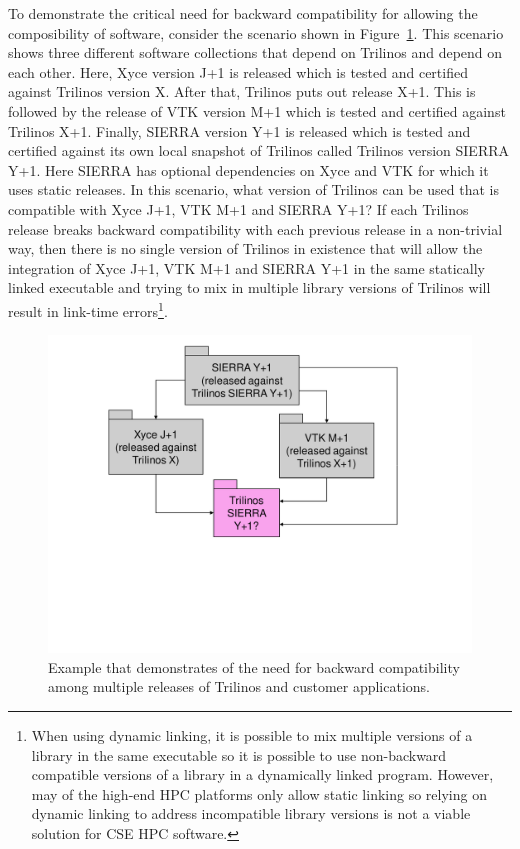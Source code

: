 \documentclass[11pt]{SANDreport}
\begin{document}
To demonstrate the critical need for backward compatibility for
allowing the composibility of software, consider the scenario shown in
Figure~\ref{fig:XyceSierraVtkTrilinosCompatibility}.  This scenario
shows three different software collections that depend on Trilinos and
depend on each other.  Here, Xyce version J+1 is released which is
tested and certified against Trilinos version X.  After that, Trilinos
puts out release X+1.  This is followed by the release of VTK version
M+1 which is tested and certified against Trilinos X+1.  Finally,
SIERRA version Y+1 is released which is tested and certified against
its own local snapshot of Trilinos called Trilinos version SIERRA Y+1.
Here SIERRA has optional dependencies on Xyce and VTK for which it uses
static releases.  In this scenario, what version of Trilinos can be
used that is compatible with Xyce J+1, VTK M+1 and SIERRA Y+1?  If
each Trilinos release breaks backward compatibility with each previous
release in a non-trivial way, then there is no single version of
Trilinos in existence that will allow the integration of Xyce J+1, VTK
M+1 and SIERRA Y+1 in the same statically linked executable and
trying to mix in multiple library versions of Trilinos will result in
link-time errors\footnote{When using dynamic linking, it is possible
to mix multiple versions of a library in the same executable so it is
possible to use non-backward compatible versions of a library in a
dynamically linked program.  However, may of the high-end HPC
platforms only allow static linking so relying on dynamic linking to
address incompatible library versions is not a viable solution for CSE
HPC software.}.

\begin{figure}
\begin{center}
\includegraphics[trim = 1.0in 2.7in 1.0in 0.2in, scale=0.55]
{XyceSierraVtkTrilinosCompatibility}
\caption{
Example that demonstrates of the need for backward compatibility among
multiple releases of Trilinos and customer applications.}
\label{fig:XyceSierraVtkTrilinosCompatibility}
\end{center}
\end{figure}
\end{document}
